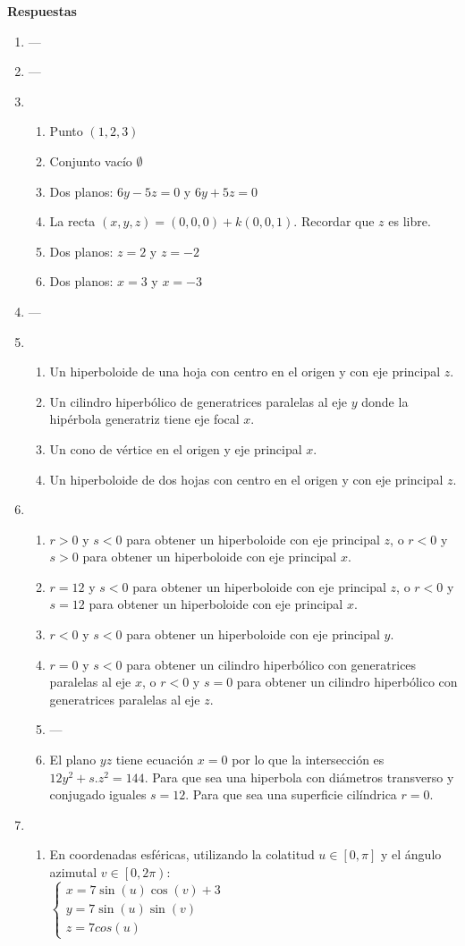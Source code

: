 \documentclass[a4paper]{article}
\newcommand{\exercise}{\item}
\newcommand{\SEL}[1]{ \left\{\begin{matrix} #1 \end{matrix}\right. }
\begin{document}
 \textbf{Respuestas}\begin{enumerate}\exercise---\exercise---\exercise\begin{enumerate} [label=(\alph*)]		\item Punto $(1,2,3)$ 
		\item Conjunto vacío $\emptyset$
		\item Dos planos: $6y-5z=0$ y $6y+5z=0$
		\item La recta $(x,y,z)=(0,0,0)+k(0,0,1)$. Recordar que $z$ es libre.
		\item Dos planos: $z=2$ y $z=-2$
		\item Dos planos: $x=3$ y $x=-3$
\end{enumerate}\exercise---\exercise\begin{enumerate} [label=(\alph*)]		\item Un hiperboloide de una hoja con centro en el origen y con eje principal $z$.
		\item Un cilindro hiperbólico de generatrices paralelas al eje $y$ donde la hipérbola generatriz tiene eje focal $x$.
		\item Un cono de vértice en el origen y eje principal $x$.
		\item Un hiperboloide de dos hojas con centro en el origen y con eje principal $z$.
\end{enumerate}\exercise\begin{enumerate} [label=(\alph*)]		\item $r>0$ y $s<0$ para obtener un hiperboloide con eje principal $z$, o $r<0$ y $s>0$ para obtener un hiperboloide con eje principal $x$.
		\item $r=12$ y $s<0$ para obtener un hiperboloide con eje principal $z$, o $r<0$ y $s=12$ para obtener un hiperboloide con eje principal $x$.
		\item $r<0$ y $s<0$ para obtener un hiperboloide con eje principal $y$.
		\item $r=0$ y $s<0$ para obtener un cilindro hiperbólico con generatrices paralelas al eje $x$, o $r<0$ y $s=0$ para obtener un cilindro hiperbólico con generatrices paralelas al eje $z$.
\item ---		\item El plano $yz$ tiene ecuación $x=0$ por lo que la intersección es $12y^2+s.z^2=144$. Para que sea una hiperbola con diámetros transverso y conjugado iguales $s=12$. Para que sea una superficie cilíndrica $r=0$.
\end{enumerate}\exercise\begin{enumerate} [label=(\alph*)]		\item En coordenadas esféricas, utilizando la colatitud $u \in \left[0,\pi\right]$ y el ángulo azimutal $v \in \left[0,2\pi\right)$: \\ $\SEL{x=7\sin(u)\cos(v)+3 \\ y=7\sin(u)\sin(v) \\ z=7 cos(u)}$

\end{enumerate}
\end{enumerate}
\end{document}
